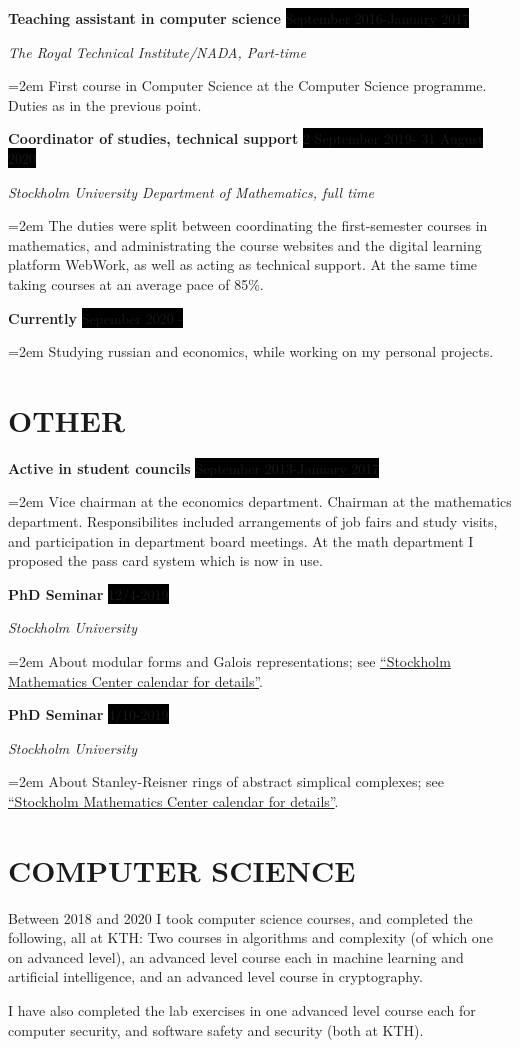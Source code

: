 \documentclass[paper=a4,fontsize=11pt]{scrartcl} %
\newcommand{\NewPart}[1]{\section*{\uppercase{#1}}}
\newcommand{\EducationEntry}[4]{
		\noindent \textbf{#1} \hfill      %
		\colorbox{Black}{%
			\parbox{6em}{%
			\hfill\color{White}#2}} \par  %
		\noindent \textit{#3} \par        %
		\noindent\hangindent=2em\hangafter=0 \small #4 %
		\normalsize \par}
\newcommand{\WorkEntry}[4]{				  %
		\noindent \textbf{#1} \hfill      %
		\colorbox{Black}{\color{White}#2} \par  %
		\noindent \textit{#3} \par              %
		\noindent\hangindent=2em\hangafter=0 \small #4 %
		\normalsize \par}
\begin{document}
\WorkEntry{Teaching assistant in computer science}{September 2016-January 2017}{The Royal Technical Institute/NADA, Part-time}{First course in Computer Science at the Computer Science programme. Duties as in the previous point.}

\WorkEntry{Coordinator of studies, technical support}{2 September 2019- 31 August 2020}{Stockholm University Department of Mathematics, full time}{The duties were split between coordinating the first-semester courses in mathematics, and administrating the course websites and the digital learning platform WebWork, as well as acting as technical support. At the same time taking courses at an average pace of 85\%.}

\WorkEntry{Currently}{Sepember 2020 - }{}{Studying russian and economics, while working on my personal projects.}

\NewPart{Other}

\WorkEntry{Active in student councils}{September 2013-January 2017}{}{Vice chairman at the economics department. Chairman at the mathematics department. Responsibilites included arrangements of job fairs and study visits, and participation in department board meetings. At the math department I proposed the pass card system which is now in use.}

\WorkEntry{PhD Seminar}{12/4-2019}{Stockholm University}{About modular forms and Galois representations; see \href{https://www.math-stockholm.se/kalender/johann-selewa-modular-forms-and-galois-representations-1.894047}{``Stockholm Mathematics Center calendar for details''}.}

\WorkEntry{PhD Seminar}{4/10-2019}{Stockholm University}{About Stanley-Reisner rings of abstract simplical complexes; see \href{https://www.math-stockholm.se/kalender/johann-selewa-stanley-reisner-rings-of-abstract-simplicial-complexes-1.927681}{``Stockholm Mathematics Center calendar for details''}.}




\NewPart{Computer Science}{}

Between 2018 and 2020 I took computer science courses, and completed the following, all at KTH:  Two courses in algorithms and complexity (of which one on advanced level),  an advanced level course each in machine learning and artificial intelligence, and an advanced level course in cryptography.

I have also completed the lab exercises in one advanced level course each for computer security, and software safety and security (both at KTH).
\end{document}
